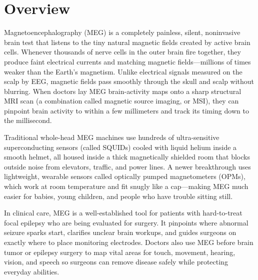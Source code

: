 \label{ch:infographic-meg}

\section{Overview}

Magnetoencephalography (MEG) is a completely painless, silent, noninvasive brain test that listens to the tiny natural magnetic fields created by active brain cells. Whenever thousands of nerve cells in the outer brain fire together, they produce faint electrical currents and matching magnetic fields---millions of times weaker than the Earth's magnetism. Unlike electrical signals measured on the scalp by EEG, magnetic fields pass smoothly through the skull and scalp without blurring. When doctors lay MEG brain-activity maps onto a sharp structural MRI scan (a combination called magnetic source imaging, or MSI), they can pinpoint brain activity to within a few millimeters and track its timing down to the millisecond.

Traditional whole-head MEG machines use hundreds of ultra-sensitive superconducting sensors (called SQUIDs) cooled with liquid helium inside a smooth helmet, all housed inside a thick magnetically shielded room that blocks outside noise from elevators, traffic, and power lines. A newer breakthrough uses lightweight, wearable sensors called optically pumped magnetometers (OPMs), which work at room temperature and fit snugly like a cap---making MEG much easier for babies, young children, and people who have trouble sitting still.

In clinical care, MEG is a well-established tool for patients with hard-to-treat focal epilepsy who are being evaluated for surgery. It pinpoints where abnormal seizure sparks start, clarifies unclear brain workups, and guides surgeons on exactly where to place monitoring electrodes. Doctors also use MEG before brain tumor or epilepsy surgery to map vital areas for touch, movement, hearing, vision, and speech so surgeons can remove disease safely while protecting everyday abilities.

